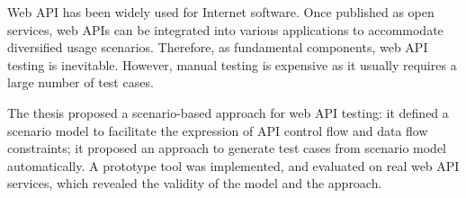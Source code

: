 
\begin{eabstract}
Web API has been widely used for Internet software. Once published as open services, web APIs can be integrated into various applications to accommodate diversified usage scenarios. Therefore, as fundamental components, web API testing is inevitable. However, manual testing is expensive as it usually requires a large number of test cases.

The thesis proposed a scenario-based approach for web API testing: it defined a scenario model to facilitate the expression of API control flow and data flow constraints; it proposed an approach to generate test cases from scenario model automatically. A prototype tool was implemented, and evaluated on real web API services, which revealed the validity of the model and the approach.
\end{eabstract}

